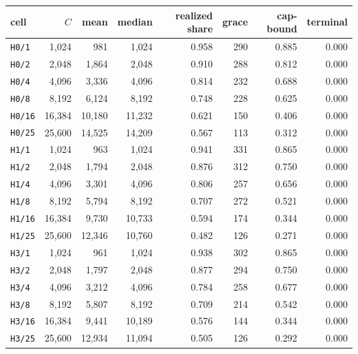\begin{tabular}{lrrrrrrr}
\toprule
cell & $C$ & mean & median & realized share & grace & cap-bound & terminal \\ \midrule
\texttt{H0/1} & 1,024 & 981 & 1,024 & 0.958 & 290 & 0.885 & 0.000 \\
\texttt{H0/2} & 2,048 & 1,864 & 2,048 & 0.910 & 288 & 0.812 & 0.000 \\
\texttt{H0/4} & 4,096 & 3,336 & 4,096 & 0.814 & 232 & 0.688 & 0.000 \\
\texttt{H0/8} & 8,192 & 6,124 & 8,192 & 0.748 & 228 & 0.625 & 0.000 \\
\texttt{H0/16} & 16,384 & 10,180 & 11,232 & 0.621 & 150 & 0.406 & 0.000 \\
\texttt{H0/25} & 25,600 & 14,525 & 14,209 & 0.567 & 113 & 0.312 & 0.000 \\
\texttt{H1/1} & 1,024 & 963 & 1,024 & 0.941 & 331 & 0.865 & 0.000 \\
\texttt{H1/2} & 2,048 & 1,794 & 2,048 & 0.876 & 312 & 0.750 & 0.000 \\
\texttt{H1/4} & 4,096 & 3,301 & 4,096 & 0.806 & 257 & 0.656 & 0.000 \\
\texttt{H1/8} & 8,192 & 5,794 & 8,192 & 0.707 & 272 & 0.521 & 0.000 \\
\texttt{H1/16} & 16,384 & 9,730 & 10,733 & 0.594 & 174 & 0.344 & 0.000 \\
\texttt{H1/25} & 25,600 & 12,346 & 10,760 & 0.482 & 126 & 0.271 & 0.000 \\
\texttt{H3/1} & 1,024 & 961 & 1,024 & 0.938 & 302 & 0.865 & 0.000 \\
\texttt{H3/2} & 2,048 & 1,797 & 2,048 & 0.877 & 294 & 0.750 & 0.000 \\
\texttt{H3/4} & 4,096 & 3,212 & 4,096 & 0.784 & 258 & 0.677 & 0.000 \\
\texttt{H3/8} & 8,192 & 5,807 & 8,192 & 0.709 & 214 & 0.542 & 0.000 \\
\texttt{H3/16} & 16,384 & 9,441 & 10,189 & 0.576 & 144 & 0.344 & 0.000 \\
\texttt{H3/25} & 25,600 & 12,934 & 11,094 & 0.505 & 126 & 0.292 & 0.000 \\
\bottomrule
\end{tabular}
